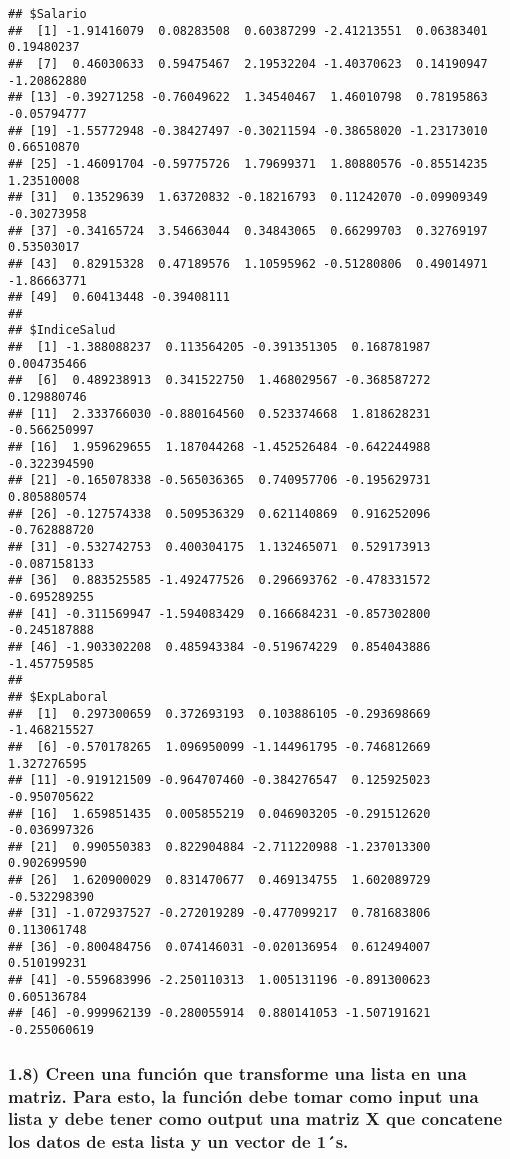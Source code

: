 \documentclass[
]{article}
\begin{document}
\begin{verbatim}
## $Salario
##  [1] -1.91416079  0.08283508  0.60387299 -2.41213551  0.06383401  0.19480237
##  [7]  0.46030633  0.59475467  2.19532204 -1.40370623  0.14190947 -1.20862880
## [13] -0.39271258 -0.76049622  1.34540467  1.46010798  0.78195863 -0.05794777
## [19] -1.55772948 -0.38427497 -0.30211594 -0.38658020 -1.23173010  0.66510870
## [25] -1.46091704 -0.59775726  1.79699371  1.80880576 -0.85514235  1.23510008
## [31]  0.13529639  1.63720832 -0.18216793  0.11242070 -0.09909349 -0.30273958
## [37] -0.34165724  3.54663044  0.34843065  0.66299703  0.32769197  0.53503017
## [43]  0.82915328  0.47189576  1.10595962 -0.51280806  0.49014971 -1.86663771
## [49]  0.60413448 -0.39408111
## 
## $IndiceSalud
##  [1] -1.388088237  0.113564205 -0.391351305  0.168781987  0.004735466
##  [6]  0.489238913  0.341522750  1.468029567 -0.368587272  0.129880746
## [11]  2.333766030 -0.880164560  0.523374668  1.818628231 -0.566250997
## [16]  1.959629655  1.187044268 -1.452526484 -0.642244988 -0.322394590
## [21] -0.165078338 -0.565036365  0.740957706 -0.195629731  0.805880574
## [26] -0.127574338  0.509536329  0.621140869  0.916252096 -0.762888720
## [31] -0.532742753  0.400304175  1.132465071  0.529173913 -0.087158133
## [36]  0.883525585 -1.492477526  0.296693762 -0.478331572 -0.695289255
## [41] -0.311569947 -1.594083429  0.166684231 -0.857302800 -0.245187888
## [46] -1.903302208  0.485943384 -0.519674229  0.854043886 -1.457759585
## 
## $ExpLaboral
##  [1]  0.297300659  0.372693193  0.103886105 -0.293698669 -1.468215527
##  [6] -0.570178265  1.096950099 -1.144961795 -0.746812669  1.327276595
## [11] -0.919121509 -0.964707460 -0.384276547  0.125925023 -0.950705622
## [16]  1.659851435  0.005855219  0.046903205 -0.291512620 -0.036997326
## [21]  0.990550383  0.822904884 -2.711220988 -1.237013300  0.902699590
## [26]  1.620900029  0.831470677  0.469134755  1.602089729 -0.532298390
## [31] -1.072937527 -0.272019289 -0.477099217  0.781683806  0.113061748
## [36] -0.800484756  0.074146031 -0.020136954  0.612494007  0.510199231
## [41] -0.559683996 -2.250110313  1.005131196 -0.891300623  0.605136784
## [46] -0.999962139 -0.280055914  0.880141053 -1.507191621 -0.255060619
\end{verbatim}

\hypertarget{creen-una-funciuxf3n-que-transforme-una-lista-en-una-matriz.-para-esto-la-funciuxf3n-debe-tomar-como-input-una-lista-y-debe-tener-como-output-una-matriz-x-que-concatene-los-datos-de-esta-lista-y-un-vector-de-1s.}{%
\subsubsection{1.8) Creen una función que transforme una lista en una
matriz. Para esto, la función debe tomar como input una lista y debe
tener como output una matriz X que concatene los datos de esta lista y
un vector de
1´s.}\label{creen-una-funciuxf3n-que-transforme-una-lista-en-una-matriz.-para-esto-la-funciuxf3n-debe-tomar-como-input-una-lista-y-debe-tener-como-output-una-matriz-x-que-concatene-los-datos-de-esta-lista-y-un-vector-de-1s.}}
\end{document}
